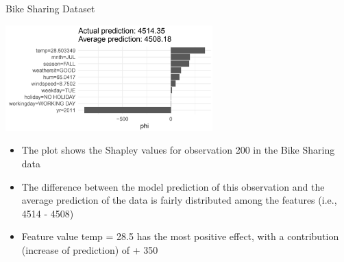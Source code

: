 \documentclass[11pt,compress,t,notes=noshow, aspectratio=169, xcolor=table]{beamer}
\begin{document}

\begin{frame}{Bike Sharing Dataset}

\begin{center}
\includegraphics[width=0.6\textwidth]{figure_man/bike-sharing03.png}
\end{center}

\begin{itemize}
    \item The plot shows the Shapley values for observation 200 in the Bike Sharing data
    \item The difference between the model prediction of this observation and the average prediction of the data is fairly distributed among the features (i.e., 4514 - 4508)
    \item Feature value temp = 28.5 has the most positive effect, with a contribution (increase of prediction) of + 350
\end{itemize}
\end{frame}


\end{document}
